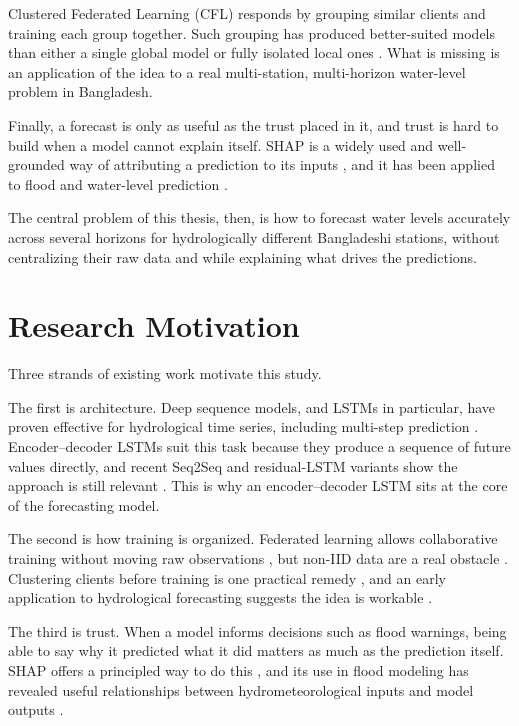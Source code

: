Clustered Federated Learning (CFL) responds by grouping similar clients and
training each group together. Such grouping has produced better-suited models
than either a single global model or fully isolated local ones
\cite{Ghosh2021,Harshvardhan2022,BenAli2026}. What is missing is an application
of the idea to a real multi-station, multi-horizon water-level problem in
Bangladesh.

Finally, a forecast is only as useful as the trust placed in it, and trust is
hard to build when a model cannot explain itself. SHAP is a widely used and
well-grounded way of attributing a prediction to its inputs
\cite{Lundberg2017}, and it has been applied to flood and water-level prediction
\cite{Huang2024,Khorrami2025}.

The central problem of this thesis, then, is how to forecast water levels
accurately across several horizons for hydrologically different Bangladeshi
stations, without centralizing their raw data and while explaining what drives
the predictions.

\section{Research Motivation}
\label{sec:1.5}

Three strands of existing work motivate this study.

The first is architecture. Deep sequence models, and LSTMs in particular, have
proven effective for hydrological time series, including multi-step prediction
\cite{Ruma2023,Kao2020,Cui2022}. Encoder--decoder LSTMs suit this task because
they produce a sequence of future values directly, and recent Seq2Seq and
residual-LSTM variants show the approach is still relevant
\cite{Kao2020,Cui2022,Lim2025,Yuan2023}. This is why an encoder--decoder LSTM
sits at the core of the forecasting model.

The second is how training is organized. Federated learning allows
collaborative training without moving raw observations \cite{McMahan2017}, but
non-IID data are a real obstacle \cite{Zhu2021,Chen2025}. Clustering clients
before training is one practical remedy
\cite{Ghosh2021,Harshvardhan2022,BenAli2026}, and an early application to
hydrological forecasting suggests the idea is workable \cite{Amanzholova2026}.

The third is trust. When a model informs decisions such as flood warnings,
being able to say why it predicted what it did matters as much as the
prediction itself. SHAP offers a principled way to do this \cite{Lundberg2017},
and its use in flood modeling has revealed useful relationships between
hydrometeorological inputs and model outputs
\cite{Huang2024,Khorrami2025,Parasar2025}.

